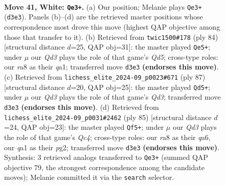 \documentclass[11pt]{article}
\begin{document}
\clearpage

\begin{figure}[p]\centering
\begin{subfigure}{0.46\textwidth}\centering
\resizebox{\linewidth}{!}{%
\newchessgame
\chessboard[
  setfen={r7/8/4kp2/3p4/5P2/p2Q2P1/P5KP/q7 w - - 1 41},
  showmover=false,
  pgfstyle=straightmove, color=movearrow, markmove={d3-e3}
]}
\caption{}
\end{subfigure}\hfill
\begin{subfigure}{0.46\textwidth}\centering
\resizebox{\linewidth}{!}{%
\newchessgame
\chessboard[
  setfen={8/5pk1/6p1/3Q3p/3p3P/6P1/5PK1/q7 w - - 4 43},
  showmover=false,
  pgfstyle=straightmove, color=movearrow, markmove={d5-e5}
]}
\caption{}
\end{subfigure}
\\[4pt]
\begin{subfigure}{0.46\textwidth}\centering
\resizebox{\linewidth}{!}{%
\newchessgame
\chessboard[
  setfen={8/5pk1/3q2p1/7p/7P/6P1/4QPK1/8 b - - 1 44},
  showmover=false,
  pgfstyle=straightmove, color=movearrow, markmove={d6-d5}
]}
\caption{}
\end{subfigure}\hfill
\begin{subfigure}{0.46\textwidth}\centering
\resizebox{\linewidth}{!}{%
\newchessgame
\chessboard[
  setfen={5k2/5p1p/Q2P2p1/2q5/1p6/5K2/P4PP1/8 b - - 5 43},
  showmover=false,
  pgfstyle=straightmove, color=movearrow, markmove={c5-f5}
]}
\caption{}
\end{subfigure}
\caption{\textbf{Move 41, White: \texttt{Qe3+}.} (a) Our position; Melanie plays \texttt{Qe3+} (\texttt{d3e3}). Panels (b)--(d) are the retrieved master positions whose correspondence most drove this move (highest QAP objective among those that transfer to it). (b) Retrieved from \texttt{twic1500\#178} (ply 84) [structural distance $d$=25, QAP obj=31]: the master played \texttt{Qe5+}; under $\mu$ our \emph{Qd3} plays the role of that game's \emph{Qd5}; cross-type roles: our \emph{r}a8 as their \emph{q}a1; transferred move \texttt{d3e3} \textbf{(endorses this move)}. (c) Retrieved from \texttt{lichess\_elite\_2024-09\_p0023\#671} (ply 87) [structural distance $d$=20, QAP obj=25]: the master played \texttt{Qd5+}; under $\mu$ our \emph{Qd3} plays the role of that game's \emph{Qd3}; transferred move \texttt{d3e3} \textbf{(endorses this move)}. (d) Retrieved from \texttt{lichess\_elite\_2024-09\_p0031\#2462} (ply 85) [structural distance $d$=24, QAP obj=23]: the master played \texttt{Qf5+}; under $\mu$ our \emph{Qd3} plays the role of that game's \emph{Qc4}; cross-type roles: our \emph{r}a8 as their \emph{q}a6, our \emph{q}a1 as their \emph{p}g2; transferred move \texttt{d3e3} \textbf{(endorses this move)}. Synthesis: 3 retrieved analogs transferred to \texttt{Qe3+} (summed QAP objective 79, the strongest correspondence among the candidate moves); Melanie committed it via the \texttt{search} selector.}
\label{fig:thought-m80}
\end{figure}
\end{document}
